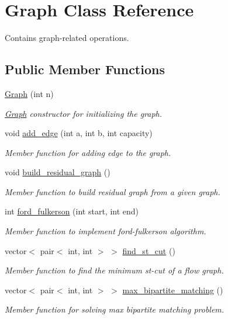 \hypertarget{classGraph}{}\section{Graph Class Reference}
\label{classGraph}


Contains graph-\/related operations.  


\subsection*{Public Member Functions}
\begin{DoxyCompactItemize}
\item 
\hyperlink{classGraph_a7b14c9bc0b5fbf50165aaf92f4aeef1d}{Graph} (int n)
\begin{DoxyCompactList}\small\item\em \hyperlink{classGraph}{Graph} constructor for initializing the graph. \end{DoxyCompactList}\item 
void \hyperlink{classGraph_a232e50e0a5670ca9bc18127852996cd9}{add\+\_\+edge} (int a, int b, int capacity)
\begin{DoxyCompactList}\small\item\em Member function for adding edge to the graph. \end{DoxyCompactList}\item 
\mbox{\label{classGraph_af06b54d5e69ddb1dc06c148b3e8b2652}} 
void \hyperlink{classGraph_af06b54d5e69ddb1dc06c148b3e8b2652}{build\+\_\+residual\+\_\+graph} ()
\begin{DoxyCompactList}\small\item\em Member function to build residual graph from a given graph. \end{DoxyCompactList}\item 
int \hyperlink{classGraph_a3fc6093d0baeeb26e90b8301e7c72a80}{ford\+\_\+fulkerson} (int start, int end)
\begin{DoxyCompactList}\small\item\em Member function to implement ford-\/fulkerson algorithm. \end{DoxyCompactList}\item 
vector$<$ pair$<$ int, int $>$ $>$ \hyperlink{classGraph_adaa9dad475e9717745135cc26102f7d5}{find\+\_\+st\+\_\+cut} ()
\begin{DoxyCompactList}\small\item\em Member function to find the minimum st-\/cut of a flow graph. \end{DoxyCompactList}\item 
vector$<$ pair$<$ int, int $>$ $>$ \hyperlink{classGraph_a88a8eca3d603c4b20b848f20e70a9b36}{max\+\_\+bipartite\+\_\+matching} ()
\begin{DoxyCompactList}\small\item\em Member function for solving max bipartite matching problem. \end{DoxyCompactList}\end{DoxyCompactItemize}


